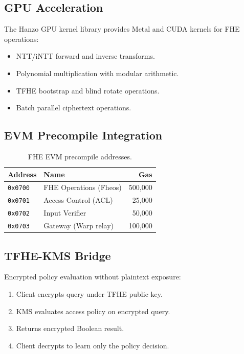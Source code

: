 \documentclass[11pt,letterpaper]{article}
\begin{document}
\subsection{GPU Acceleration}

The Hanzo GPU kernel library provides Metal and CUDA kernels for FHE operations:
\begin{itemize}
\item NTT/iNTT forward and inverse transforms.
\item Polynomial multiplication with modular arithmetic.
\item TFHE bootstrap and blind rotate operations.
\item Batch parallel ciphertext operations.
\end{itemize}

\subsection{EVM Precompile Integration}

\begin{table}[H]
\centering
\begin{tabular}{@{}llr@{}}
\toprule
\textbf{Address} & \textbf{Name} & \textbf{Gas} \\
\midrule
\texttt{0x0700} & FHE Operations (Fheos) & 500,000 \\
\texttt{0x0701} & Access Control (ACL) & 25,000 \\
\texttt{0x0702} & Input Verifier & 50,000 \\
\texttt{0x0703} & Gateway (Warp relay) & 100,000 \\
\bottomrule
\end{tabular}
\caption{FHE EVM precompile addresses.}
\label{tab:fhe-precompiles}
\end{table}

\subsection{TFHE-KMS Bridge}

Encrypted policy evaluation without plaintext exposure:
\begin{enumerate}
\item Client encrypts query under TFHE public key.
\item KMS evaluates access policy on encrypted query.
\item Returns encrypted Boolean result.
\item Client decrypts to learn only the policy decision.
\end{enumerate}
\end{document}
